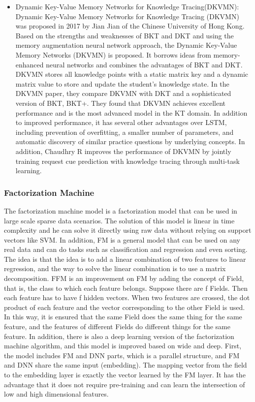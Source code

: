 \documentclass[11pt,en]{elegantpaper}
\begin{document}
\begin{itemize}
	\item Dynamic Key-Value Memory Networks for Knowledge Tracing(DKVMN): Dynamic Key-Value Memory Networks for Knowledge Tracing (DKVMN) was proposed in 2017 by Jian Jian of the Chinese University of Hong Kong\cite{zhang2017dynamic}. Based on the strengths and weaknesses of BKT and DKT and using the memory augmentation neural network approach, the Dynamic Key-Value Memory Networks (DKVMN) is proposed. It borrows ideas from memory-enhanced neural networks and combines the advantages of BKT and DKT. DKVMN stores all knowledge points with a static matrix key and a dynamic matrix value to store and update the student's knowledge state. In the DKVMN paper, they compare DKVMN with DKT and a sophisticated version of BKT, BKT+. They found that DKVMN achieves excellent performance and is the most advanced model in the KT domain. In addition to improved performance, it has several other advantages over LSTM, including prevention of overfitting, a smaller number of parameters, and automatic discovery of similar practice questions by underlying concepts. In addition, Chaudhry R\cite{chaudhry2018modeling} improves the performance of DKVMN by jointly training request cue prediction with knowledge tracing through multi-task learning.
\end{itemize}

\subsubsection{Factorization Machine}
The factorization machine model is a factorization model that can be used in large scale sparse data scenarios\cite{rendle2010factorization}. The solution of this model is linear in time complexity and he can solve it directly using raw data without relying on support vectors like SVM. In addition, FM is a general model that can be used on any real data and can do tasks such as classification and regression and even sorting. The idea is that the idea is to add a linear combination of two features to linear regression, and the way to solve the linear combination is to use a matrix decomposition. FFM is an improvement on FM by adding the concept of Field\cite{juan2016field}, that is, the class to which each feature belongs. Suppose there are f Fields. Then each feature has to have f hidden vectors. When two features are crossed, the dot product of each feature and the vector corresponding to the other Field is used. In this way, it is ensured that the same Field does the same thing for the same feature, and the features of different Fields do different things for the same feature. In addition, there is also a deep learning version of the factorization machine algorithm\cite{guo2017deepfm}, and this model is improved based on wide and deep. First, the model includes FM and DNN parts, which is a parallel structure, and FM and DNN share the same input (embedding). The mapping vector from the field to the embedding layer is exactly the vector learned by the FM layer. It has the advantage that it does not require pre-training and can learn the intersection of low and high dimensional features.
\end{document}
